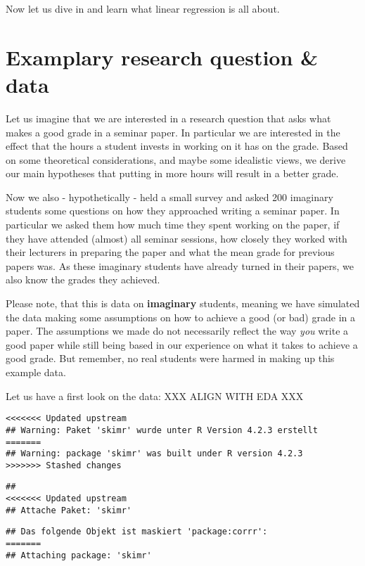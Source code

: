 \documentclass[
]{book}
\begin{document}
Now let us dive in and learn what linear regression is all about.

\hypertarget{examplary-research-question-data}{%
\section{Examplary research question \& data}\label{examplary-research-question-data}}

Let us imagine that we are interested in a research question that asks what
makes a good grade in a seminar paper. In particular we are interested in the
effect that the hours a student invests in working on it has on the grade. Based
on some theoretical considerations, and maybe some idealistic views, we derive
our main hypotheses that putting in more hours will result in a better grade.

Now we also - hypothetically - held a small survey and asked 200 imaginary
students some questions on how they approached writing a seminar paper. In
particular we asked them how much time they spent working on the paper, if they
have attended (almost) all seminar sessions, how closely they worked with their
lecturers in preparing the paper and what the mean grade for previous papers
was. As these imaginary students have already turned in their papers, we also
know the grades they achieved.

Please note, that this is data on \textbf{imaginary} students, meaning we have
simulated the data making some assumptions on how to achieve a good (or bad)
grade in a paper. The assumptions we made do not necessarily reflect the way
\emph{you} write a good paper while still being based in our experience on what it
takes to achieve a good grade. But remember, no real students were harmed in
making up this example data.

Let us have a first look on the data:
XXX ALIGN WITH EDA XXX

\begin{verbatim}
<<<<<<< Updated upstream
## Warning: Paket 'skimr' wurde unter R Version 4.2.3 erstellt
=======
## Warning: package 'skimr' was built under R version 4.2.3
>>>>>>> Stashed changes
\end{verbatim}

\begin{verbatim}
## 
<<<<<<< Updated upstream
## Attache Paket: 'skimr'
\end{verbatim}

\begin{verbatim}
## Das folgende Objekt ist maskiert 'package:corrr':
=======
## Attaching package: 'skimr'
\end{verbatim}
\end{document}
